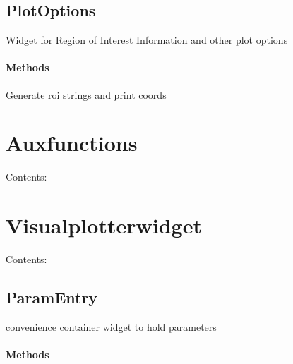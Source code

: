\documentclass[letterpaper,10pt,english]{sphinxmanual}
\begin{document}
\subsection{PlotOptions}
\label{PlotOptions::doc}\label{PlotOptions:plotoptions}

\begin{fulllineitems}
\label{PlotOptions:Optionswidgets.PlotOptions}
Widget for Region of Interest Information and other plot options
\paragraph{Methods}

\begin{fulllineitems}
\label{PlotOptions:Optionswidgets.PlotOptions.set_roi}
Generate roi strings and print coords

\end{fulllineitems}


\end{fulllineitems}



\section{Auxfunctions}
\label{Auxfunctions::doc}\label{Auxfunctions:auxfunctions}
Contents:


\section{Visualplotterwidget}
\label{Visualplotterwidget::doc}\label{Visualplotterwidget:visualplotterwidget}
Contents:


\subsection{ParamEntry}
\label{ParamEntry::doc}\label{ParamEntry:paramentry}

\begin{fulllineitems}
\label{ParamEntry:Visualplotterwidget.ParamEntry}
convenience container widget to hold parameters
\paragraph{Methods}

\end{fulllineitems}
\end{document}
